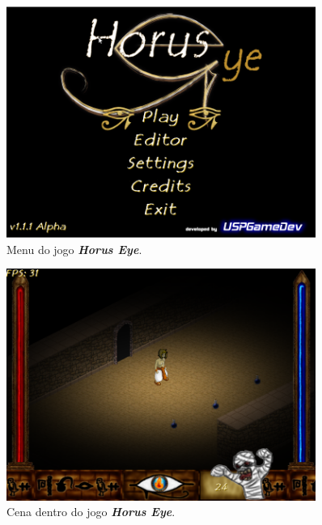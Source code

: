 \documentclass[12pt,onecolumn,a4paper]{article}
\begin{document}
        \begin{figure}[htb]
            \centering
            \includegraphics[width=0.9\textwidth]{images/horus_01.png}
            \caption{Menu do jogo \textit{\textbf{Horus Eye}}.}
            \label{fig:horus_01}
        \end{figure}
        
        \begin{figure}[htb]
            \centering
            \includegraphics[width=0.9\textwidth]{images/horus_02.png}
            \caption{Cena dentro do jogo \textit{\textbf{Horus Eye}}.}
            \label{fig:horus_02}
        \end{figure}
        
\end{document}
